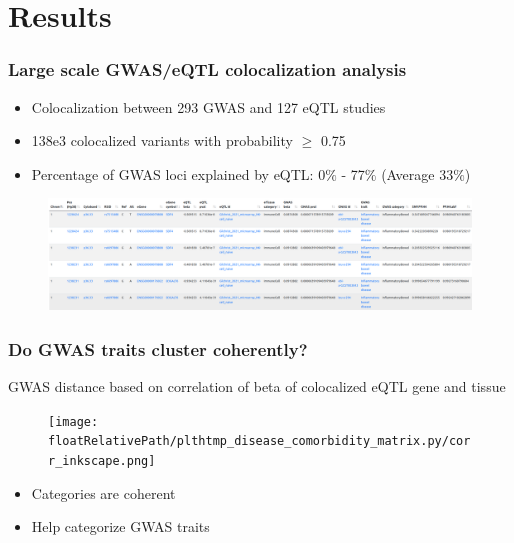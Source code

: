 \documentclass{beamer}
\newcommand*{\floatRelativePath}{../out/gwas417/pval_5e-08/r2_0.1/kb_1000/window_1000000/75_50}%
\begin{document}
    \section{Results}

    \begin{frame}
        \frametitle{Large scale GWAS/eQTL colocalization analysis}

        \begin{itemize}
            \item Colocalization between 293 GWAS and 127 eQTL studies
            \item 138e3 colocalized variants with probability $\geq$ 0.75
            \item Percentage of GWAS loci explained by eQTL: 0$\%$ - 77$\%$ (Average 33$\%$)
        \end{itemize}

        \begin{figure}[!]
            \includegraphics[width=\textwidth]{../presentation_230120_gold2022_paris/fig/coloc_web.png}
        \end{figure}

    \end{frame}

    \begin{frame}
        \frametitle{Do GWAS traits cluster coherently?}

        GWAS distance based on correlation of beta of colocalized eQTL gene and tissue

        \begin{figure}[!]
            \texttt{[image: \\floatRelativePath/plthtmp\_disease\_comorbidity\_matrix.py/corr\_inkscape.png]}
        \end{figure}

        \begin{itemize}
            \item Categories are coherent
            \item Help categorize GWAS traits
        \end{itemize}

    \end{frame}
\end{document}
